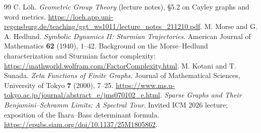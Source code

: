 \documentclass[11pt,a4paper]{article}
\theoremstyle{definition}\newtheorem{definition}[theorem]{Definition}
\begin{document}
\begin{thebibliography}{99}
 C. L\"oh. \emph{Geometric Group Theory} (lecture notes), \S5.2 on Cayley graphs and word metrics. \url{https://loeh.app.uni-regensburg.de/teaching/ggt_ws1011/lecture_notes_211210.pdf}.
 M. Morse and G. A. Hedlund. \emph{Symbolic Dynamics II: Sturmian Trajectories}. American Journal of Mathematics \textbf{62} (1940), 1--42.
 Background on the Morse--Hedlund characterization and Sturmian factor complexity: \url{https://mathworld.wolfram.com/FactorComplexity.html}.
 M. Kotani and T. Sunada. \emph{Zeta Functions of Finite Graphs}. Journal of Mathematical Sciences, University of Tokyo \textbf{7} (2000), 7--25. \url{https://www.ms.u-tokyo.ac.jp/journal/abstract_e/jms070102_e.html}.
 \emph{Sparse Graphs and Their Benjamini--Schramm Limits: A Spectral Tour}. Invited ICM 2026 lecture; exposition of the Ihara--Bass determinant formula. \url{https://epubs.siam.org/doi/10.1137/25M1805862}.
\end{thebibliography}
\end{document}
